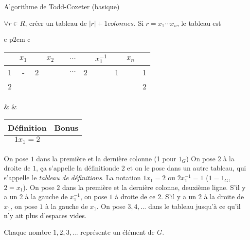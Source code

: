      \begin{algorithm}
       \caption{Algorithme de Todd-Coxeter (basique)}
       \label{alg:todd-coxeter-basique}
       \begin{algorithmic}
         \State $\forall r \in R$, créer un tableau de $|r|+1 colonnes$.
         \State Si $r = x_1 \cdots x_n$, le tableau est
         \State
         \begin{tabular}{c p{2cm} c}
           \begin{tabular}{|ccccccccccc|}
             \hline
             & $x_1$ & & $x_2$ & & $\cdots$ & & $x_1^{-1}$ & & $x_n$ & \\
             \hline
             1 & - & 2 &  & & $\cdots$ & 2 & & 1 & & 1 \\
             2 &  & & & & & & & & & 2\\
             \hline
           \end{tabular}
             & &
                 \begin{tabular}{|c|c|}
                   \hline
                   Définition & Bonus \\
                   \hline
                   $1x_1 = 2$ & \\
                   \hline
                 \end{tabular}
         \end{tabular}
         \State On pose $1$ dans la première et la dernière colonne (1 pour $1_G$)
         \State On pose $2$ à la droite de $1$, ça s'appelle la \og définition\fg de $2$ et on le pose dans un
         autre tableau, qui s'appelle le \emph{tableau de définitions}.  La
         notation $1 x_1 = 2$ ou $2 x_1^{-1} = 1$ ($1 = 1_G$, $2 = x_1$).
         \State On pose $2$ dans la première et la dernière colonne, deuxième ligne.
         \State S'il y a un 2 à la gauche de $x_1^{-1}$, on pose $1$ à droite de ce 2.
         \State S'il y a un 2 à la droite de $x_1$, on pose $1$ à la gauche de $x_1$.
         \State On pose $3, 4, \ldots$ dans le tableau jusqu'à ce qu'il n'y ait plus d'espaces vides.
       \end{algorithmic} 
     \end{algorithm}
     

     \begin{rem} \label{rem:rem-1}
       Chaque nombre $1, 2, 3, \ldots$ représente un élément de $G$.
     \end{rem}
     

